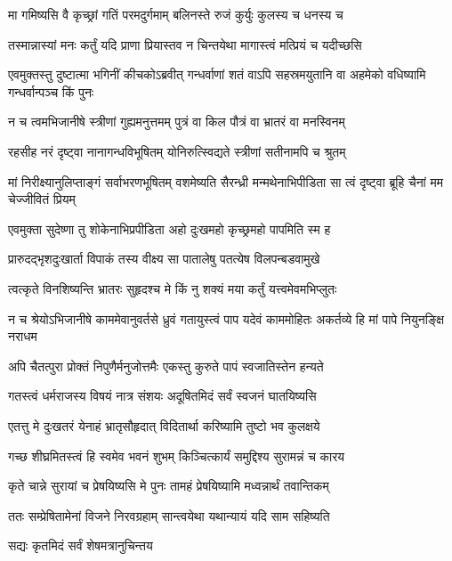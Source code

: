 \twolineshloka
{मा गमिष्यसि वै कृच्छ्रां गतिं परमदुर्गमाम्}
{बलिनस्ते रुजं कुर्युः कुलस्य च धनस्य च}


\twolineshloka
{तस्मान्नास्यां मनः कर्तुं यदि प्राणा प्रियास्तव}
{न चिन्तयेथा मागास्त्वं मत्प्रियं च यदीच्छसि}



\threelineshloka
{एवमुक्तस्तु दुष्टात्मा भगिनीं कीचकोऽब्रवीत्}
{गन्धर्वाणां शतं वाऽपि सहस्रमयुतानि वा}
{अहमेको वधिष्यामि गन्धर्वान्पञ्च किं पुनः}


\twolineshloka
{न च त्वमभिजानीषे स्त्रीणां गुह्यमनुत्तमम्}
{पुत्रं वा किल पौत्रं वा भ्रातरं वा मनस्विनम्}


\twolineshloka
{रहसीह नरं दृष्ट्वा नानागन्धविभूषितम्}
{योनिरुत्स्विद्यते स्त्रीणां सतीनामपि च श्रुतम्}


\threelineshloka
{मां निरीक्ष्यानुलिप्ताङ्गं सर्वाभरणभूषितम्}
{वशमेष्यति सैरन्ध्री मन्मथेनाभिपीडिता}
{सा त्वं दृष्ट्वा ब्रूहि चैनां मम चेज्जीवितं प्रियम्}



\twolineshloka
{एवमुक्ता सुदेष्णा तु शोकेनाभिप्रपीडिता}
{अहो दुःखमहो कृच्छ्रमहो पापमिति स्म ह}


\twolineshloka
{प्रारुदद्भृशदुःखार्ता विपाकं तस्य वीक्ष्य सा}
{पातालेषु पतत्येष विलपन्बडवामुखे}


\twolineshloka
{त्वत्कृते विनशिष्यन्ति भ्रातरः सुहृदश्च मे}
{किं नु शक्यं मया कर्तुं यत्त्वमेवमभिप्लुतः}


\threelineshloka
{न च श्रेयोऽभिजानीषे काममेवानुवर्तसे}
{ध्रुवं गतायुस्त्वं पाप यदेवं काममोहितः}
{अकर्तव्ये हि मां पापे नियुनङ्क्षि नराधम}


\twolineshloka
{अपि चैतत्पुरा प्रोक्तं निपुणैर्मनुजोत्तमैः}
{एकस्तु कुरुते पापं स्वजातिस्तेन हन्यते}


\twolineshloka
{गतस्त्वं धर्मराजस्य विषयं नात्र संशयः}
{अदूषितमिदं सर्वं स्वजनं घातयिष्यसि}


\twolineshloka
{एतत्तु मे दुःखतरं येनाहं भ्रातृसौहृदात्}
{विदितार्था करिष्यामि तुष्टो भव कुलक्षये}


\twolineshloka
{गच्छ शीघ्रमितस्त्वं हि स्वमेव भवनं शुभम्}
{किञ्चित्कार्यं समुद्दिश्य सुरामन्नं च कारय}


\twolineshloka
{कृते चान्ने सुरायां च प्रेषयिष्यसि मे पुनः}
{तामहं प्रेषयिष्यामि मध्वन्नार्थं तवान्तिकम्}


\twolineshloka
{ततः सम्प्रेषितामेनां विजने निरवग्रहाम्}
{सान्त्वयेथा यथान्यायं यदि साम सहिष्यति}


\onelineshloka
{सद्यः कृतमिदं सर्वं शेषमत्रानुचिन्तय}


